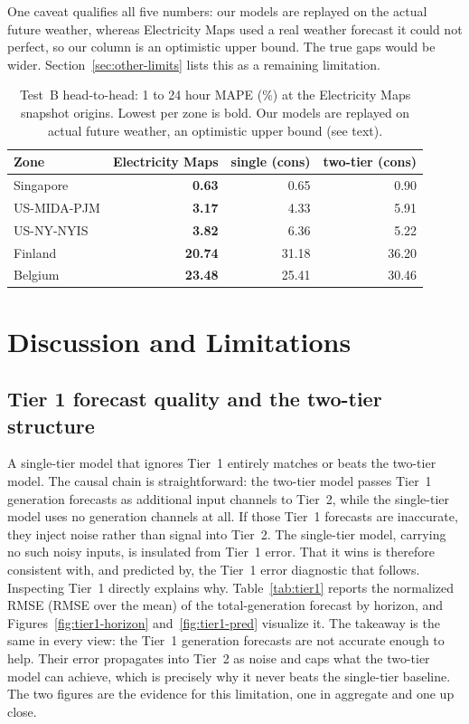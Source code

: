 \documentclass[sigconf,nonacm,a4paper]{acmart}  %
\begin{document}
One caveat qualifies all five numbers: our models are replayed on the actual future
weather, whereas Electricity Maps used a real weather forecast it could not perfect,
so our column is an optimistic upper bound. The true gaps would be wider.
Section~\ref{sec:other-limits} lists this as a remaining limitation.

\begin{table}[H]
    \caption{Test~B head-to-head: 1 to 24 hour MAPE (\%) at the Electricity Maps
    snapshot origins. Lowest per zone is bold. Our models are replayed on actual future
    weather, an optimistic upper bound (see text).}
    \label{tab:testb-h2h}
    \begin{tabular}{lrrr}
    \toprule
    Zone & Electricity Maps & single (cons) & two-tier (cons) \\
    \midrule
    Singapore   & \textbf{0.63}  & 0.65  & 0.90 \\
    US-MIDA-PJM & \textbf{3.17}  & 4.33  & 5.91 \\
    US-NY-NYIS  & \textbf{3.82}  & 6.36  & 5.22 \\
    Finland     & \textbf{20.74} & 31.18 & 36.20 \\
    Belgium     & \textbf{23.48} & 25.41 & 30.46 \\
    \bottomrule
    \end{tabular}
\end{table}

\section{Discussion and Limitations}

\subsection{Tier 1 forecast quality and the two-tier structure}
A single-tier model that ignores Tier~1 entirely matches or beats the two-tier
model. The causal chain is straightforward: the two-tier model passes Tier~1
generation forecasts as additional input channels to Tier~2, while the single-tier
model uses no generation channels at all. If those Tier~1 forecasts are inaccurate,
they inject noise rather than signal into Tier~2. The single-tier model, carrying
no such noisy inputs, is insulated from Tier~1 error. That it wins is therefore
consistent with, and predicted by, the Tier~1 error diagnostic that follows. Inspecting Tier~1 directly explains why. Table~\ref{tab:tier1} reports the
normalized RMSE (RMSE over the mean) of the total-generation forecast by horizon,
and Figures~\ref{fig:tier1-horizon} and~\ref{fig:tier1-pred} visualize it. The
takeaway is the same in every view: the Tier~1 generation forecasts are not accurate
enough to help. Their error propagates into Tier~2 as noise and caps what the
two-tier model can achieve, which is precisely why it never beats the single-tier
baseline. The two figures are the evidence for this limitation, one in aggregate and
one up close.
\end{document}
